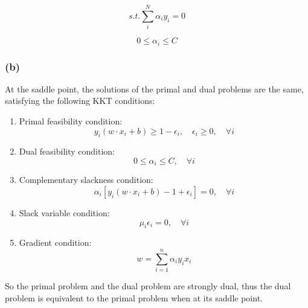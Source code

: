 \documentclass[oneside,solution]{seu-ml-assign}
\begin{document}
\begin{equation}
  s.t.\sum_{i}^{N}\alpha_iy_i=0
\end{equation}

\begin{equation}
  0\leq \alpha_i \leq C
\end{equation}




\subsubsection{(b)}
At the saddle point, the solutions of the primal and dual problems are the same, satisfying the following KKT conditions:

\begin{enumerate}
  \item Primal feasibility condition:
        \begin{equation}
          y_i (w \cdot x_i + b) \geq 1 - \epsilon_i, \quad \epsilon_i \geq 0, \quad \forall i
        \end{equation}
  \item Dual feasibility condition:
        \begin{equation}
          0 \leq \alpha_i \leq C, \quad \forall i
        \end{equation}
  \item Complementary slackness condition:
        \begin{equation}
          \alpha_i [y_i (w \cdot x_i + b) - 1 + \epsilon_i] = 0, \quad \forall i
        \end{equation}
  \item Slack variable condition:
        \begin{equation}
          \mu_i \epsilon_i = 0, \quad \forall i
        \end{equation}
  \item Gradient condition:
        \begin{equation}
          w = \sum_{i=1}^n \alpha_i y_i x_i
        \end{equation}
\end{enumerate}

So the primal problem and the dual problem are strongly dual, thus the dual problem is equivalent to the primal problem when at its saddle point.




\subsection{}
\end{document}

